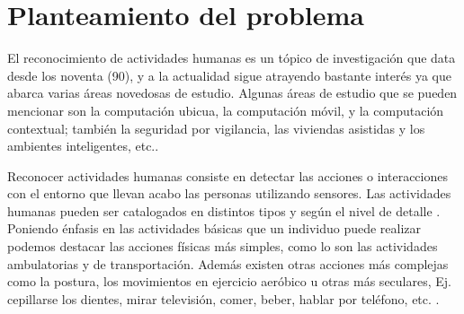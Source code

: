\section{Planteamiento del problema}

\label{sec11:planteamiento}

El reconocimiento de actividades humanas es un tópico de investigación
que data desde los noventa (90), y a la actualidad sigue atrayendo
bastante interés ya que abarca varias áreas novedosas de estudio.
Algunas áreas de estudio que se pueden mencionar son la computación
ubicua, la computación móvil, y la computación contextual; también
la seguridad por vigilancia, las viviendas asistidas y los ambientes
inteligentes, etc.\cite{Chen2012}. 

Reconocer actividades humanas consiste en detectar las acciones o
interacciones con el entorno que llevan acabo las personas utilizando
sensores. Las actividades humanas pueden ser catalogados en distintos
tipos y según el nivel de detalle \cite{Chen2012}. Poniendo énfasis
en las actividades básicas que un individuo puede realizar podemos
destacar las acciones físicas más simples, como lo son las actividades
ambulatorias y de transportación. Además existen otras acciones más
complejas como la postura, los movimientos en ejercicio aeróbico u
otras más seculares, Ej. cepillarse los dientes, mirar televisión,
comer, beber, hablar por teléfono, etc. \cite{LaraLabrador2013}.

